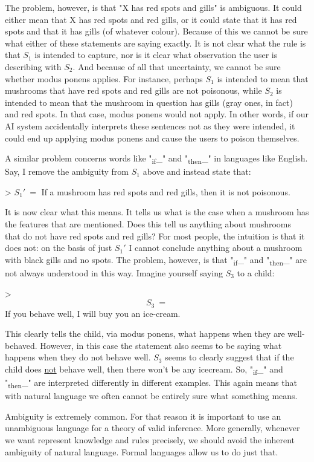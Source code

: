 \documentclass[11pt]{article}
\begin{document}
The problem, however, is that "X has red spots and gills" is ambiguous. It could either mean that X has red spots and red gills, or it could state that it has red spots and that it has gills (of whatever colour). Because of this we cannot be sure what either of these statements are saying exactly. It is not clear what the rule is that \(S_1\) is intended to capture, nor is it clear what observation the user is describing with \(S_2\). And because of all that uncertainty, we cannot be sure whether modus ponens applies. For instance, perhaps \(S_1\) is intended to mean that mushrooms that have red spots and red gills are not poisonous, while \(S_2\) is intended to mean that the mushroom in question has gills (gray ones, in fact) and red spots. In that case, modus ponens would not apply. In other words, if our AI system accidentally interprets these sentences not as they were intended, it could end up applying modus ponens and cause the users to poison themselves. 

A similar problem concerns words like "\textsubscript{if}\_" and "\textsubscript{then}\_" in languages like English. Say, I remove the ambiguity from \(S_1\) above and instead state that:

> \(S_1'\ =\) If a mushroom has red spots and red gills, then it is not poisonous.

It is now clear what this means. It tells us what is the case when a mushroom has the features that are mentioned. Does this tell us anything about mushrooms that do not have red spots and red gills? For most people, the intuition is that it does not: on the basis of just \(S_1'\) I cannot conclude anything about a mushroom with black gills and no spots. The problem, however, is that "\textsubscript{if}\_" and "\textsubscript{then}\_" are not always understood in this way. Imagine yourself saying \(S_3\) to a child:

> $$S_3\ =$$ If you behave well, I will buy you an ice-cream.

This clearly tells the child, via modus ponens, what happens when they are well-behaved. However, in this case the statement also seems to be saying what happens when they do not behave well. \(S_3\) seems to clearly suggest that if the child does \uline{not} behave well, then there won't be any icecream. So, "\textsubscript{if}\_" and "\textsubscript{then}\_" are interpreted differently in different examples. This again means that with natural language we often cannot be entirely sure what something means. 

Ambiguity is extremely common. For that reason it is important to use an unambiguous language for a theory of valid inference. More generally, whenever we want represent knowledge and rules precisely, we should avoid the inherent ambiguity of natural language. Formal languages allow us to do just that.
\end{document}
